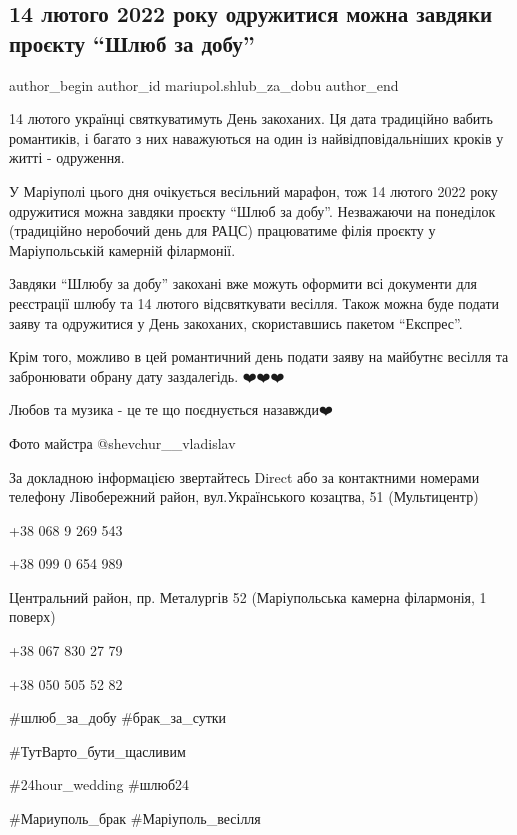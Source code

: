  
 
 
 
 

\subsection{14 лютого 2022 року одружитися можна завдяки проєкту \enquote{Шлюб за добу}}
\label{sec:20_01_2022.fb.mariupol.shlub_za_dobu.1.14_ljutogo_2022}

\ifcmt
 author_begin
   author_id mariupol.shlub_za_dobu
 author_end
\fi

14 лютого українці святкуватимуть День закоханих. Ця дата традиційно вабить
романтиків, і багато з них наважуються на один із найвідповідальніших кроків у
житті - одруження. 

У Маріуполі цього дня очікується весільний марафон, тож 14 лютого 2022 року
одружитися можна завдяки проєкту \enquote{Шлюб за добу}. Незважаючи на  понеділок
(традиційно неробочий день для РАЦС) працюватиме філія проєкту у Маріупольській
камерній філармонії.

Завдяки  \enquote{Шлюбу за добу} закохані вже можуть оформити всі документи для
реєстрації шлюбу та 14 лютого відсвяткувати весілля. Також можна буде подати
заяву та одружитися у День закоханих, скориставшись пакетом \enquote{Експрес}.

Крім того, можливо в цей романтичний день подати заяву на майбутнє весілля та
забронювати обрану дату заздалегідь.  ❤️❤️❤️

Любов та музика - це те що поєднується назавжди❤️

Фото майстра @shevchur\_\_vladislav

За докладною інформацією звертайтесь Direct або за контактними номерами телефону
Лівобережний район, вул.Українського козацтва, 51 (Мультицентр)

+38 068 9 269 543\par
+38 099 0 654 989\par
Центральний район, пр. Металургів 52 (Маріупольська камерна філармонія, 1 поверх)\par
+38 067 830 27 79\par
+38 050 505 52 82

\#шлюб\_за\_добу \#брак\_за\_сутки

\#ТутВарто\_бути\_щасливим 

\#24hour\_wedding \#шлюб24 

\#Мариуполь\_брак \#Маріуполь\_весілля
